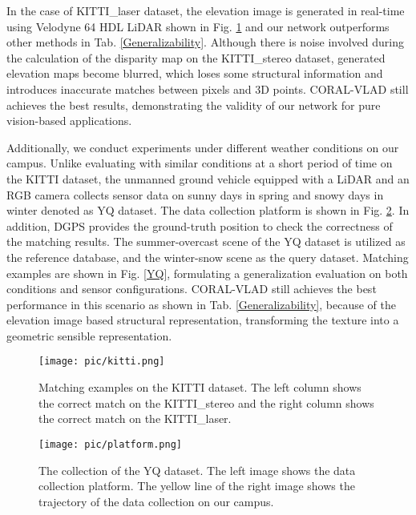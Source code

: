 \documentclass[letterpaper, 10 pt, conference]{ieeeconf}  \usepackage{tabularx}
\begin{document}
In the case of KITTI\_laser dataset, the elevation image is generated in real-time using Velodyne 64 HDL LiDAR shown in Fig. \ref{Kitti} and our network outperforms other methods in Tab. \ref{Generalizability}. Although there is noise involved during the calculation of the disparity map on the KITTI\_stereo dataset, generated elevation maps become blurred, which loses some structural information and introduces inaccurate matches between pixels and 3D points. CORAL-VLAD still achieves the best results, demonstrating the validity of our network for pure vision-based applications. 

Additionally, we conduct experiments under different weather conditions on our campus. Unlike evaluating with similar conditions at a short period of time on the KITTI dataset, the unmanned ground vehicle equipped with a LiDAR and an RGB camera collects sensor data on sunny days in spring and snowy days in winter denoted as YQ dataset. The data collection platform is shown in Fig. \ref{YQ_p}. In addition, DGPS provides the ground-truth position to check the correctness of the matching results. The summer-overcast scene of the YQ dataset is utilized as the reference database, and the winter-snow scene as the query dataset. Matching examples are shown in Fig. \ref{YQ}, formulating a generalization evaluation on both conditions and sensor configurations. CORAL-VLAD still achieves the best performance in this scenario as shown in Tab. \ref{Generalizability}, because of the elevation image based structural representation, transforming the texture into a geometric sensible representation.

\begin{figure}[tp]
	\vspace{2.6mm}
	\centering
	\texttt{[image: pic/kitti.png]}
	
	\caption{Matching examples on the KITTI dataset. The left column shows the correct match on the KITTI\_stereo and the right column shows the correct match on the KITTI\_laser.}
	\label{Kitti}
	\vspace{-3pt}
	
\end{figure}

\begin{figure}[tp]
	\centering
	\texttt{[image: pic/platform.png]}
	
	\caption{The collection of the YQ dataset. The left image shows the data collection platform. The yellow line of the right image shows the trajectory of the data collection on our campus. }
	\label{YQ_p}
	\vspace{-10pt}
\end{figure}
\end{document}
